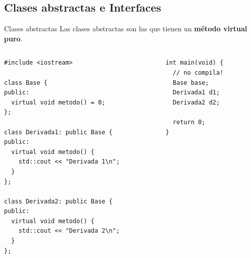 \subsection{Clases abstractas e Interfaces}
\begin{frame}{Clases abstractas}{
Las clases abstractas son las que tienen un \textbf{m\'etodo virtual puro}.
}

   \begin{columns}[t]
      \begin{column}{.6\linewidth}
         \begin{lstlisting}[style=normal,firstnumber=1]
#include <iostream>

class Base {
public:
  virtual void metodo() = 0;
};

class Derivada1: public Base {
public:
  virtual void metodo() {
    std::cout << "Derivada 1\n";
  }
};

class Derivada2: public Base {
public:
  virtual void metodo() {
    std::cout << "Derivada 2\n";
  }
};

         \end{lstlisting}
      \end{column}
      \begin{column}{.4\linewidth}
         \begin{lstlisting}[style=normal,firstnumber=23,linebackgroundcolor={%
                 \btLstHLR<1>{24,25}%
         }]
int main(void) {
  // no compila!
  Base base; 
  Derivada1 d1;
  Derivada2 d2;

  return 0;
}
         \end{lstlisting}

      \end{column}
   \end{columns}
\end{frame}

